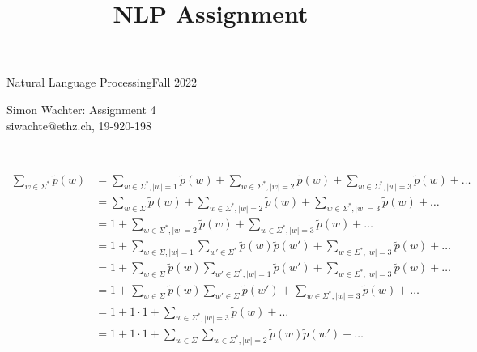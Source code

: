\documentclass[a4paper,12pt]{ETHexercise}
\title{NLP Assignment}
\begin{document}


\newcommand{\pair}[2]{{\langle #1 , #2 \rangle}}
\newcommand{\score}[2]{\text{score}_{\theta}(\langle #1, #2 \rangle, \boldsymbol{w})}
\newcommand{\sscore}[1]{\text{score}_{\theta}(#1, \boldsymbol{w})}
\newcommand*{\eos}{\text{EOS}}

{}
{\Large Natural Language Processing}{Fall 2022}
\begin{center}
	{\Huge Simon Wachter: Assignment 4}\\
	\quad\newline
	siwachte@ethz.ch, 19-920-198\\
	\quad\newline
	\timestamp
\end{center}
\begin{question}\\
	\begin{subquestion}
		\begin{align}
			\sum_{w \in \Sigma^*} \tilde{p}(w) & = \sum_{w \in \Sigma^*, |w|=1} \tilde{p}(w) + \sum_{w \in \Sigma^*, |w|=2} \tilde{p}(w) + \sum_{w \in \Sigma^*, |w|=3} \tilde{p}(w) + \dots \\
			                                   & = \sum_{w \in \Sigma} \tilde{p}(w) + \sum_{w \in \Sigma^*, |w|=2} \tilde{p}(w) + \sum_{w \in \Sigma^*, |w|=3} \tilde{p}(w) + \dots          \\
			                                   & = 1 + \sum_{w \in \Sigma^*, |w|=2} \tilde{p}(w) + \sum_{w \in \Sigma^*, |w|=3} \tilde{p}(w) + \dots                                         \\
			                                   & = 1 + \sum_{w \in \Sigma, |w|=1} \sum_{w' \in \Sigma^*} \tilde{p}(w) \tilde{p}(w') + \sum_{w \in \Sigma^*, |w|=3} \tilde{p}(w) + \dots      \\
			                                   & = 1 + \sum_{w \in \Sigma} \tilde{p}(w) \sum_{w' \in \Sigma^*, |w|=1} \tilde{p}(w') + \sum_{w \in \Sigma^*, |w|=3} \tilde{p}(w) + \dots      \\
			                                   & = 1 + \sum_{w \in \Sigma} \tilde{p}(w) \sum_{w' \in \Sigma} \tilde{p}(w') + \sum_{w \in \Sigma^*, |w|=3} \tilde{p}(w) + \dots               \\
			                                   & = 1 + 1 \cdot 1 + \sum_{w \in \Sigma^*, |w|=3} \tilde{p}(w) + \dots                                                                         \\
			                                   & = 1 + 1 \cdot 1 + \sum_{w \in \Sigma}  \sum_{w \in \Sigma^*, |w|=2} \tilde{p}(w) \tilde{p}(w') + \dots                                      \\

\end{align}
\end{subquestion}
\end{question}
\end{document}
